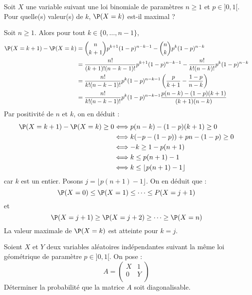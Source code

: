 \documentclass[a4paper,10pt]{report}
\begin{document}
\begin{Exa} Soit $X$ une variable suivant une loi binomiale de paramètres $n \geq 1$ et $p \in ]0,1[$. Pour quelle(s) valeur(s) de $k$, $\P(X=k)$ est-il maximal ?
\end{Exa}

\corr Soit $n \geq 1$. Alors pour tout $k \in \lbrace 0, \ldots, n-1\rbrace$,
\begin{align*}
\P(X=k+1)- \P(X=k) & = \binom{n}{k+1} p^{k+1} (1-p)^{n-k-1} - \binom{n}{k} p^{k} (1-p)^{n-k} \\
& = \dfrac{n!}{(k+1)!(n-k-1)!} p^{k+1} (1-p)^{n-k-1} - \dfrac{n!}{k!(n-k)!}  p^{k} (1-p)^{n-k} \\
& = \dfrac{n!}{k! (n-k-1)!} p^k(1-p)^{n-k-1} \left( \dfrac{p}{k+1} - \dfrac{1-p}{n-k} \right) \\
& =  \dfrac{n!}{k! (n-k-1)!} p^k(1-p)^{n-k-1} \dfrac{p(n-k)- (1-p)(k+1)}{(k+1)(n-k)}
\end{align*}
Par positivité de $n$ et $k$, on en déduit :
\begin{align*}
\P(X=k+1)- \P(X=k) \geq 0 & \Longleftrightarrow p(n-k)- (1-p)(k+1) \geq 0 \\
& \Longleftrightarrow k (-p-(1-p)) + pn -(1-p) \geq 0 \\
& \Longleftrightarrow -k \geq 1-p(n+1) \\
& \Longleftrightarrow k \leq p(n+1)-1 \\
& \Longleftrightarrow k \leq \lfloor  p(n+1)-1 \rfloor
\end{align*}
car $k$ est un entier. Posons $j= \lfloor  p(n+1)-1 \rfloor$. On en déduit que :
$$ \P(X=0) \leq \P(X=1) \leq \cdots \leq P(X=j+1)$$
et 
$$ \P(X=j+1) \geq \P(X=j+2) \geq \cdots \geq \P(X=n)$$
La valeur maximale de $\P(X=k)$ est atteinte pour $k=j$.

\begin{Exa} Soient $X$ et $Y$ deux variables aléatoires indépendantes suivant la même loi géométrique de paramètre $p \in ]0,1[$. On pose :
$$ A = \begin{pmatrix}
X & 1 \\
0 & Y \\
\end{pmatrix}$$
Déterminer la probabilité que la matrice $A$ soit diagonalisable.
\end{Exa} 
\end{document}
